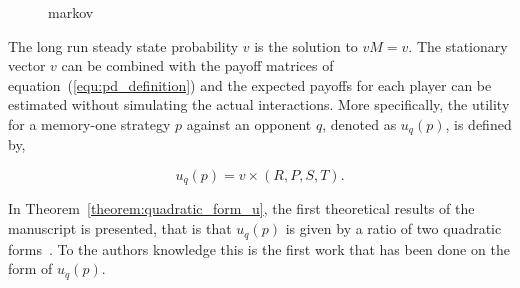\documentclass[10pt]{article}
\begin{document}
\begin{figure}[!htbp]
    \begin{minipage}{0.35\textwidth}
        
        \caption{markov}
        \label{fig:markov_chain}
    \end{minipage}
    \begin{minipage}{0.45\textwidth}
    \begin{equation*}
        
    \end{equation*}
    \end{minipage}
\end{figure}

The long run steady state probability \(v\) is the solution to \(v M = v\). The
stationary vector \(v\) can be combined with the payoff matrices of
equation~(\ref{equ:pd_definition}) and the expected payoffs for each player
can be estimated without simulating the actual interactions. More
specifically, the utility for a memory-one strategy \(p\) against an opponent \(q\),
denoted as \(u_q(p)\), is defined by,

\begin{equation}\label{eq:press_dyson_utility}
    u_q(p) = v \times (R, P, S, T).
\end{equation}

In Theorem~\ref{theorem:quadratic_form_u}, the first theoretical results of
the manuscript is presented, that is that \(u_q(p)\) is given by a ratio of
two quadratic forms~\cite{kepner2011}. To the authors knowledge this is the
first work that has been done on the form of \(u_q(p)\).
\end{document}
